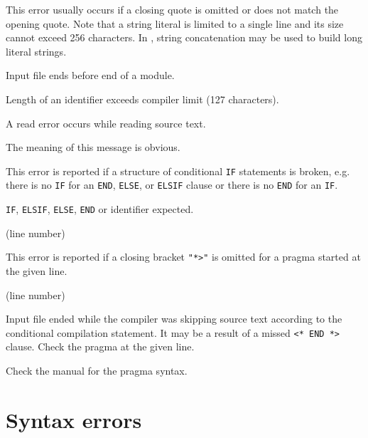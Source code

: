 
This error usually occurs if a closing quote is omitted or does not
match the opening quote. Note that a string literal is limited to a single
line and its size cannot exceed 256 characters. In \mt{},
string concatenation may be used to build long literal strings.


Input file ends before end of a module.


Length of an identifier exceeds compiler limit (127 characters).


A read error occurs while reading source text.


The meaning of this message is obvious.


This error is reported if a structure of conditional \verb'IF' statements is
broken, e.g. there is no \verb'IF' for an \verb'END', \verb'ELSE', or \verb'ELSIF'
clause or there is no \verb'END' for an \verb'IF'.


\verb'IF', \verb'ELSIF', \verb'ELSE', \verb'END' or identifier expected.

(line number)

This error is reported if a closing bracket \verb'"*>"' is omitted
for a pragma started at the given line.

(line number)

Input file ended while the compiler was skipping source text according
to the conditional compilation statement. It may be a result of a missed
\verb'<* END *>' clause. Check the pragma at the given line.


Check the manual for the pragma syntax.

\section{Syntax errors}

